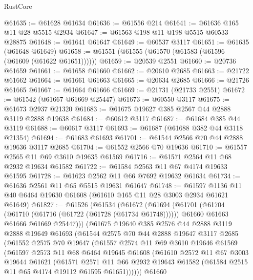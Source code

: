 \begin{lexlean}{RustCore}
\begin{coremodule}
@61635 := @61628 @61634
@61636 := @61556 @214
@61641 := @61636 @165 @11 @28 @5515 @2934
@61647 := @61563 @198 @11 @198 @5515 @60533 @28875
@61648 := @61641 @61647
@61649 := @60537 @3117
@61651 := @61635 (@61648 @61649)
@61658 := @61551 (@61555 (@61570 (@61583 (@61596 (@61609 (@61622 @61651))))))
@61659 := @20539 @2551
@61660 := @20736 @61659
@61661 := @61658 @61660
@61662 := @20610 @2685
@61663 := @21722 @61662
@61664 := @61661 @61663
@61665 := @20634 @2685
@61666 := @21726 @61665
@61667 := @61664 @61666
@61669 := @21731 (@21733 @2551)
@61672 := @61542 (@61667 @61669 @25447)
@61673 := @60550 @3117
@61675 := @61673 @2937 @21320
@61683 := @61675 @19627 @385 @2567 @44 @2888 @3119 @2888 @19638
@61684 := @60612 @3117
@61687 := @61684 @385 @44 @3119
@61688 := @60617 @3117
@61693 := @61687 (@61688 @382 @44 @3118 @21354)
@61694 := @61683 @61693
@61701 := @61544 @2566 @70 @44 @2888 @19636 @3117 @2685
@61704 := @61552 @2566 @70 @19636
@61710 := @61557 @2565 @11 @69 @3610 @19635 @61569
@61716 := @61571 @2564 @11 @68 @2932 @19634 @61582
@61722 := @61584 @2563 @11 @67 @4174 @19633 @61595
@61728 := @61623 @2562 @11 @66 @7692 @19632 @61634
@61734 := @61636 @2561 @11 @65 @5515 @19631 @61647
@61748 := @61597 @1136 @11 @40 @6464 @19630 @61608 (@61610 @165 @11 @28 @3003 @2934 @61621 @61649)
@61827 := @61526
    (@61534
      (@61672
        (@61694
          (@61701
            (@61704 (@61710 (@61716 (@61722 (@61728 (@61734 @61748))))))
            @61660
            @61663
            @61666
            @61669
            @25447)))
      (@61675
        @19640
        @385
        @2576
        @44
        @2888
        @3119
        @2888
        @19649
        @61693
        (@61544
          @2575
          @70
          @44
          @2888
          @19647
          @3117
          @2685
          (@61552
            @2575
            @70
            @19647
            (@61557
              @2574
              @11
              @69
              @3610
              @19646
              @61569
              (@61597
                @2573
                @11
                @68
                @6464
                @19645
                @61608
                (@61610
                  @2572
                  @11
                  @67
                  @3003
                  @19644
                  @61621
                  (@61571
                    @2571
                    @11
                    @66
                    @2932
                    @19643
                    @61582
                    (@61584 @2515 @11 @65 @4174 @19112 @61595 @61651))))))
          @61660

\end{coremodule}
\end{lexlean}

